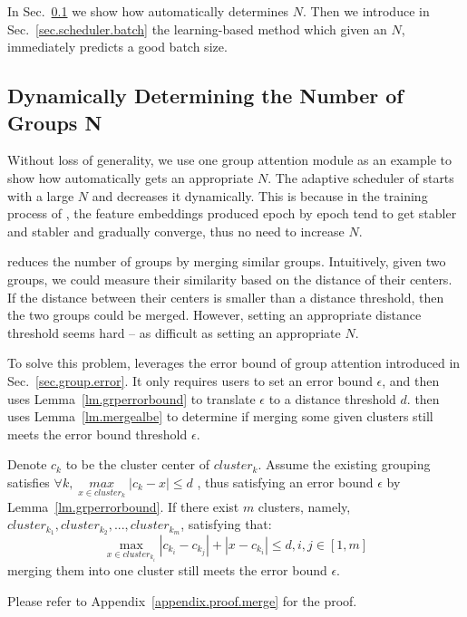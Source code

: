 In Sec.~\ref{sec.scheduler.group} we show how \system automatically determines $N$. 
Then we introduce in Sec.~\ref{sec.scheduler.batch} the learning-based method which given an $N$, immediately predicts a good batch size.

\subsection{Dynamically Determining the Number of Groups N}
\label{sec.scheduler.group}
Without loss of generality, we use one group attention module as an example to show how \system automatically gets an appropriate $N$. The adaptive scheduler of \system starts with a large $N$ and decreases it dynamically. This is because in the training process of \system, the feature embeddings produced epoch by epoch tend to get stabler and stabler and gradually converge, thus no need to increase $N$.

\system reduces the number of groups by merging similar groups. Intuitively, given two groups, we could measure their similarity based on the distance of their centers. If the distance between their centers is smaller than a distance threshold, then the two groups could be merged. However, setting an appropriate distance threshold seems hard -- as difficult as setting an appropriate $N$.

To solve this problem, \system leverages the error bound of group attention introduced in Sec.~\ref{sec.group.error}. It only requires users to set an error bound $\epsilon$, and then uses Lemma~\ref{lm.grperrorbound} to translate $\epsilon$ to a distance threshold $d$.
\system then uses Lemma~\ref{lm.mergealbe} to determine if merging some given clusters still meets the error bound threshold $\epsilon$. 

\vspace{-2mm}
\begin{lemma}
\label{lm.mergealbe}
Denote $c_k$ to be the cluster center of $cluster_k$. Assume the existing grouping satisfies $\mathit{\forall k,\mathop{max}\limits_{x \in cluster_k} |c_k-x| \leq d}$
, thus satisfying an error bound $\epsilon$ by Lemma~\ref{lm.grperrorbound}.
If there exist $m$ clusters, namely, $cluster_{k_1},cluster_{k_2},...,cluster_{k_m}$, satisfying that:
\begin{equation}
\label{equ.mergecond}
\mathop{max}\limits_{x \in cluster_{k_i}} |c_{k_i}-c_{k_j}|+|x-c_{k_i}| \leq d, i,j \in [1,m]
\end{equation}
merging them into one cluster still meets the error bound $\epsilon$.
\end{lemma}
Please refer to Appendix~\ref{appendix.proof.merge} for the proof.

